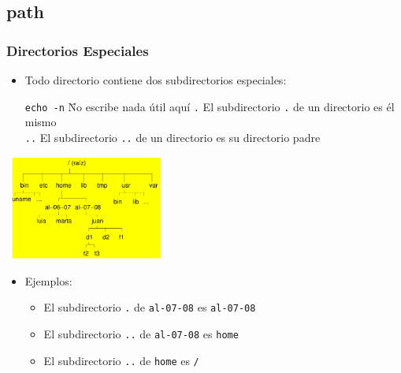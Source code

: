 \documentclass[ucs]{beamer}
\begin{document}
\subsection{path}


\begin{frame}[fragile]
  \frametitle{Directorios Especiales}

  \begin{itemize}
  \item Todo directorio contiene dos subdirectorios especiales:
    \begin{footnotesize}
      \begin{tabbing}
        \verb|echo -n|\hspace{3mm} \= No escribe nada útil aquí\kill
        \verb|.| \> El subdirectorio \verb|.| de un directorio es él mismo\\
        \verb|..| \> El subdirectorio \verb|..| de un directorio es su
        directorio padre\\
      \end{tabbing}
    \end{footnotesize}
  \end{itemize}
  \begin{minipage}{5cm}
    ~\hspace{-1cm}\includegraphics[width=5cm]{figs/unix-tree-2}
  \end{minipage}
  \begin{minipage}{5.0cm}
  \begin{itemize}
  \item Ejemplos:
    \begin{footnotesize}
      \begin{itemize}
      \item El subdirectorio \verb|.| de \verb|al-07-08| es \verb|al-07-08|
      \item El subdirectorio \verb|..| de \verb|al-07-08| es \verb|home|
      \item El subdirectorio \verb|..| de \verb|home| es \verb|/|
      \end{itemize}
    \end{footnotesize}    
  \end{itemize}
  \end{minipage}

\end{frame}
\end{document}
